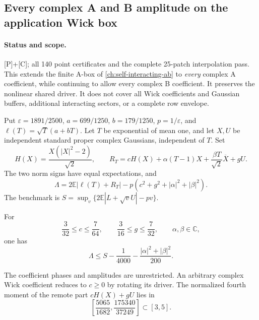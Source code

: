 \subsection{Every complex A and B amplitude on the application Wick box}
\label{sec:all-amplitude-application-wick}
\paragraph{Status and scope.} [P]+[C]; all 140 point certificates and the complete 25-patch interpolation pass. This extends the finite A-box of \autoref{ch:self-interacting-ab} to \emph{every} complex A coefficient, while continuing to allow every complex B coefficient. It preserves the nonlinear shared driver. It does not cover all Wick coefficients and Gaussian buffers, additional interacting sectors, or a complete row envelope.

Put $\varepsilon=1891/2500$, $a=699/1250$, $b=179/1250$, $p=1/\varepsilon$, and $\ell(T)=\sqrt T(a+bT)$. Let $T$ be exponential of mean one, and let $X,U$ be independent standard proper complex Gaussians, independent of $T$. Set
\[
 H(X)=\frac{X(|X|^2-2)}{\sqrt2},\qquad
 R_T=cH(X)+\alpha(T-1)X+\frac{\beta T}{\sqrt2}\overline X+gU.
\]
The two norm signs have equal expectations, and
\[
 \Lambda=2\mathbb E|\ell(T)+R_T|
       -p(c^2+g^2+|\alpha|^2+|\beta|^2).
\]
The benchmark is $S=\sup_v\{2\mathbb E|L+\sqrt vU|-pv\}$.

\begin{theorem}
For
\[
 \frac3{32}\le c\le\frac7{64},\qquad
 \frac3{16}\le g\le\frac7{32},\qquad
 \alpha,\beta\in\mathbb C,
\]
one has
\[
 \boxed{\quad \Lambda\le S-\frac1{4000}
       -\frac{|\alpha|^2+|\beta|^2}{200}.\quad}
\]
\end{theorem}
The coefficient phases and amplitudes are unrestricted. An arbitrary complex Wick coefficient reduces to $c\ge0$ by rotating its driver. The normalized fourth moment of the remote part $cH(X)+gU$ lies in
\[
 \left[\frac{5065}{1682},\frac{175340}{37249}\right]
 \subset[3,5].
\]

